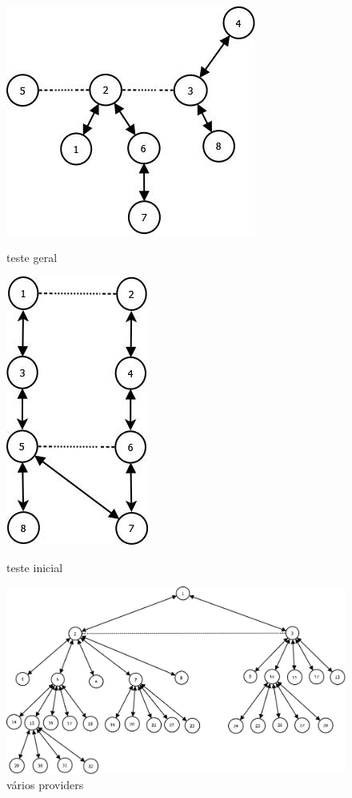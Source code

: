 \documentclass[a4paper]{article}
\begin{document}
\begin{landscape}
\begin{figure}[!htb]
  \includegraphics[scale=0.3]{esquesito.jpg}
  \caption{teste geral}\label{fig:teste geral}
\endminipage\hfill
{}
  \includegraphics[scale=0.3]{tabela.jpg}
  \caption{teste inicial}\label{fig:teste inicial}
\endminipage\hfill
{}%
  \includegraphics[width=\linewidth]{many_providers.jpg}
  \caption{vários providers}\label{fig:vários providers}
\endminipage
\end{figure}

\end{landscape}
\end{document}
